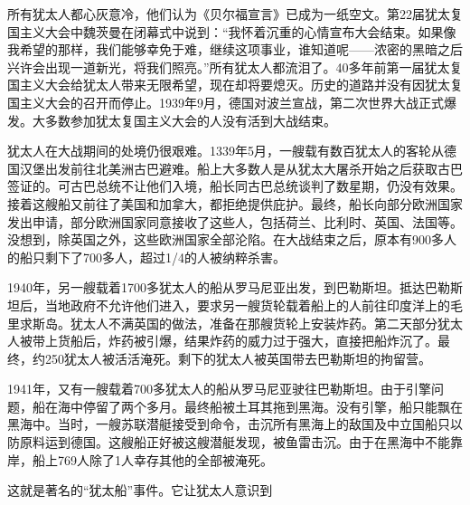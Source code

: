 \documentclass{article}
\begin{document}
所有犹太人都心灰意冷，他们认为《贝尔福宣言》已成为一纸空文。第22届犹太复国主义大会中魏茨曼在闭幕式中说到：“我怀着沉重的心情宣布大会结束。如果像我希望的那样，我们能够幸免于难，继续这项事业，谁知道呢——浓密的黑暗之后兴许会出现一道新光，将我们照亮。”所有犹太人都流泪了。40多年前第一届犹太复国主义大会给犹太人带来无限希望，现在却将要熄灭。历史的道路并没有因犹太复国主义大会的召开而停止。1939年9月，德国对波兰宣战，第二次世界大战正式爆发。大多数参加犹太复国主义大会的人没有活到大战结束。

犹太人在大战期间的处境仍很艰难。1339年5月，一艘载有数百犹太人的客轮从德国汉堡出发前往北美洲古巴避难。船上大多数人是从犹太大屠杀开始之后获取古巴签证的。可古巴总统不让他们入境，船长同古巴总统谈判了数星期，仍没有效果。接着这艘船又前往了美国和加拿大，都拒绝提供庇护。最终，船长向部分欧洲国家发出申请，部分欧洲国家同意接收了这些人，包括荷兰、比利时、英国、法国等。没想到，除英国之外，这些欧洲国家全部沦陷。在大战结束之后，原本有900多人的船只剩下了700多人，超过1/4的人被纳粹杀害。

1940年，另一艘载着1700多犹太人的船从罗马尼亚出发，到巴勒斯坦。抵达巴勒斯坦后，当地政府不允许他们进入，要求另一艘货轮载着船上的人前往印度洋上的毛里求斯岛。犹太人不满英国的做法，准备在那艘货轮上安装炸药。第二天部分犹太人被带上货船后，炸药被引爆，结果炸药的威力过于强大，直接把船炸沉了。最终，约250犹太人被活活淹死。剩下的犹太人被英国带去巴勒斯坦的拘留营。

1941年，又有一艘载着700多犹太人的船从罗马尼亚驶往巴勒斯坦。由于引擎问题，船在海中停留了两个多月。最终船被土耳其拖到黑海。没有引擎，船只能飘在黑海中。当时，一艘苏联潜艇接受到命令，击沉所有黑海上的敌国及中立国船只以防原料运到德国。这艘船正好被这艘潜艇发现，被鱼雷击沉。由于在黑海中不能靠岸，船上769人除了1人幸存其他的全部被淹死。

这就是著名的“犹太船”事件。它让犹太人意识到
\end{document}
